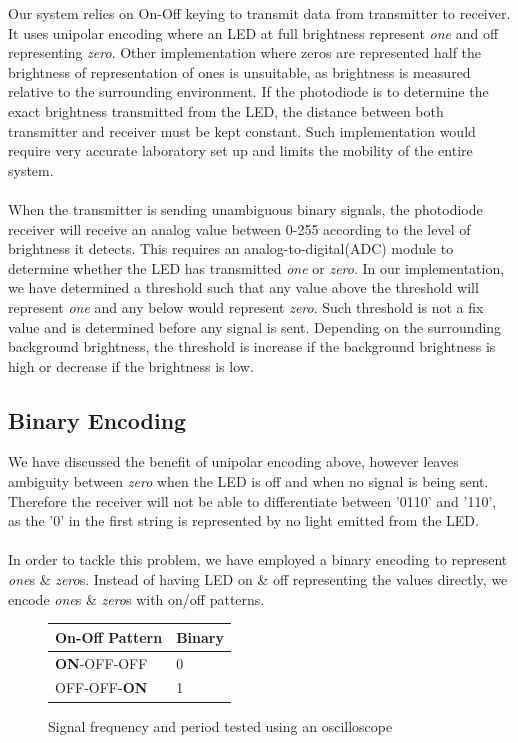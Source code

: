 \documentclass[letterpaper, 10 pt, conference]{ieeeconf}  %
\begin{document}
Our system relies on On-Off keying to transmit data from transmitter to receiver. It uses unipolar encoding where an LED at full brightness represent \textit{one} and off  representing \textit{zero}. Other implementation where zeros are represented half the brightness of representation of ones is unsuitable, as brightness is measured relative to the surrounding environment. If the photodiode is to determine the exact brightness transmitted from the LED, the distance between both transmitter and receiver must be kept constant\cite{JoshuaE.Barnes2003}. Such implementation would require very accurate laboratory set up and limits the mobility of the entire system.
\\ \\
When the transmitter is sending unambiguous binary signals, the photodiode receiver will receive an analog value between 0-255 according to the level of brightness it detects. This requires an analog-to-digital(ADC) module to determine whether the LED has transmitted \textit{one} or \textit{zero}. In our implementation, we have determined a threshold such that any value above the threshold will represent \textit{one} and any below would represent \textit{zero}. Such threshold is not a fix value and is determined before any signal is sent. Depending on the surrounding background brightness, the threshold is increase if the background brightness is high or decrease if the brightness is low. 


\subsection{Binary Encoding}
We have discussed the benefit of unipolar encoding above, however leaves ambiguity between \textit{zero} when the LED is off and when no signal is being sent. Therefore the receiver will not be able to differentiate between '0110' and '110', as the '0' in the first string is represented by no light emitted from the LED. 
\\ \\ 
In order to tackle this problem, we have employed a binary encoding to represent \textit{one}s \& \textit{zero}s. Instead of having LED on \& off representing the values directly, we encode \textit{one}s \& \textit{zero}s with on/off patterns.

\begin{figure}[h!]
  \centering
  \begin{tabular}{ll} \toprule
  On-Off Pattern & Binary \\ \midrule
  \textbf{ON}-OFF-OFF & 0 \\
  OFF-OFF-\textbf{ON} & 1 \\ \bottomrule
  \end{tabular}
  \caption{Signal frequency and period tested using an oscilloscope}
\end{figure}
\end{document}
